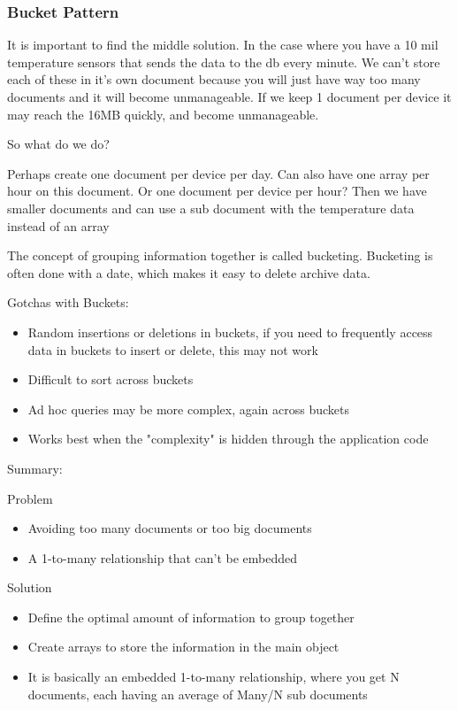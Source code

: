 \documentclass[11pt]{article}
\begin{document}
\subsubsection{Bucket Pattern}
\label{sec:orgdc96a06}
It is important to find the middle solution. In the case where you have a 10 mil temperature sensors that sends the data to the db every minute.
We can't store each of these in it's own document because you will just have way too many documents and it will become unmanageable.
If we keep 1 document per device it may reach the 16MB quickly, and become unmanageable.

So what do we do?

Perhaps create one document per device per day. Can also have one array per hour on this document.
Or one document per device per hour? Then we have smaller documents and can use a sub document with the temperature data instead of an array

The concept of grouping information together is called bucketing. Bucketing is often done with a date, which makes it easy to delete archive data.

Gotchas with Buckets:
\begin{itemize}
\item Random insertions or deletions in buckets, if you need to frequently access data in buckets to insert or delete, this may not work
\item Difficult to sort across buckets
\item Ad hoc queries may be more complex, again across buckets
\item Works best when the "complexity" is hidden through the application code
\end{itemize}

Summary:

Problem
\begin{itemize}
\item Avoiding too many documents or too big documents
\item A 1-to-many relationship that can't be embedded
\end{itemize}

Solution
\begin{itemize}
\item Define the optimal amount of information to group together
\item Create arrays to store the information in the main object
\item It is basically an embedded 1-to-many relationship, where you get N documents, each having an average of Many/N sub documents
\end{itemize}
\end{document}

